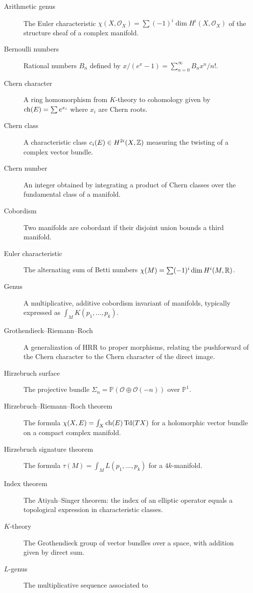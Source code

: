 \begin{description}
    \item[Arithmetic genus] The Euler characteristic
    \(\chi(X, \mathcal{O}_X) = \sum (-1)^i \dim H^i(X,
    \mathcal{O}_X)\) of the structure sheaf of a complex manifold.
    \item[Bernoulli numbers] Rational numbers \(B_n\) defined by
    \(x/(e^x - 1) = \sum_{n=0}^\infty B_n x^n / n!\).
    \item[Chern character] A ring homomorphism from \(K\)-theory to
    cohomology given by \(\operatorname{ch}(E) = \sum e^{x_i}\) where \(x_i\) are
    Chern roots.
    \item[Chern class] A characteristic class \(c_i(E) \in H^{2i}(X,
    \mathbb{Z})\) measuring the twisting of a complex vector bundle.
    \item[Chern number] An integer obtained by integrating a product
    of Chern classes over the fundamental class of a manifold.
    \item[Cobordism] Two manifolds are cobordant if their disjoint
    union bounds a third manifold.
    \item[Euler characteristic] The alternating sum of Betti numbers
    \(\chi(M) = \sum (-1)^i \dim H^i(M, \mathbb{R})\).
    \item[Genus] A multiplicative, additive cobordism invariant of
    manifolds, typically expressed as \(\int_M K(p_1, \dots, p_k)\).
    \item[Grothendieck--Riemann--Roch] A generalization of HRR to
    proper morphisms, relating the pushforward of the Chern character
    to the Chern character of the direct image.
    \item[Hirzebruch surface] The projective bundle
    \(\Sigma_n = \mathbb{P}(\mathcal{O} \oplus \mathcal{O}(-n))\) over
    \(\mathbb{P}^1\).
    \item[Hirzebruch--Riemann--Roch theorem] The formula
    \(\chi(X, E) = \int_X \operatorname{ch}(E) \operatorname{Td}(TX)\) for a holomorphic vector
    bundle on a compact complex manifold.
    \item[Hirzebruch signature theorem] The formula
    \(\tau(M) = \int_M L(p_1, \dots, p_k)\) for a \(4k\)-manifold.
    \item[Index theorem] The Atiyah--Singer theorem: the index of an
    elliptic operator equals a topological expression in
    characteristic classes.
    \item[\(K\)-theory] The Grothendieck group of vector bundles over
    a space, with addition given by direct sum.
    \item[\(L\)-genus] The multiplicative sequence associated to

\end{description}
